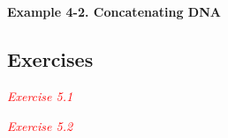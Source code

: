 \chapter{}
\label{chap:chapter5}
\minitoc


\section{}

\section{}

\section{}

\section{}

\section{}

\section{}

\section{}

\section{}




\textbf{Example 4-2. Concatenating DNA}







\section{Exercises}
\textcolor{red}{\textit{Exercise 5.1}}
\begin{adjustwidth}{1cm}{}
\end{adjustwidth}

\textcolor{red}{\textit{Exercise 5.2}}
\begin{adjustwidth}{1cm}{}
\end{adjustwidth}

